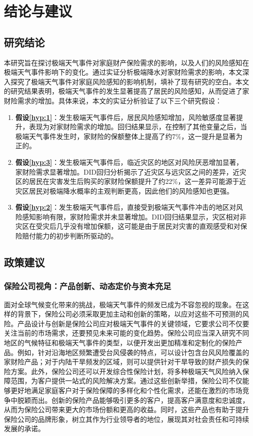 \chapter{结论与建议}\label{chap:5}

\section{研究结论}
本研究旨在探讨极端天气事件对家庭财产保险需求的影响，以及人们的风险感知在极端天气事件影响下的变化。通过实证分析极端降水对家财险需求的影响，本文深入探究了极端天气事件对家庭风险感知的影响机制，填补了现有研究的空白。本文的研究结果表明，极端天气事件的发生显著提高了居民的风险感知，从而促进了家财险需求的增加。具体来说，本文的实证分析验证了以下三个研究假设：

\begin{enumerate}
    \item \textbf{假设\ref{hyp:1}}：发生极端天气事件后，居民风险感知增加，风险敏感度显著提升，表现为对家财险需求的增加。回归结果显示，在控制了其他变量之后，当极端天气事件发生时，家财险的保额整体上提高了约7\%，这一提升是显著为正的。
    \item \textbf{假设\ref{hyp:3}}：发生极端天气事件后，临近灾区的地区对风险厌恶增加显著，家财险需求显著增加。DID回归分析揭示了近灾区与远灾区之间的差异，近灾区的居民在灾害发生后购买的家财险保额提升了约22\%，这一差异可能源于近灾区居民对极端降水概率的主观判断更高，因此他们的风险感知也更强。
    \item \textbf{假设\ref{hyp:2}}：发生极端天气事件后，直接受到极端天气事件冲击的地区对风险感知影响有限，家财险需求并未显著增加。DID回归结果显示，灾区相对非灾区在受灾后几乎没有增加保额，这可能是由于居民对灾害的直观感受和对保险赔付能力的初步判断所驱动的。
\end{enumerate}

\section{政策建议}
\subsection{保险公司视角：产品创新、动态定价与资本充足}
面对全球气候变化带来的挑战，极端天气事件的频发已成为不容忽视的现象。在这样的背景下，保险公司必须采取更加主动和创新的策略，以应对这些不可预测的风险。产品设计与创新是保险公司应对极端天气事件的关键领域，它要求公司不仅要关注当前的市场需求，还要预见未来可能的变化趋势。保险公司应当深入研究不同地区的气候特征和极端天气事件的类型，以便开发出更加精准和定制化的保险产品。例如，针对沿海地区频繁遭受台风侵袭的特点，可以设计包含台风风险覆盖的家财险产品；对于内陆干旱频发的区域，则可以提供针对干旱导致的财产损失的保险方案。此外，保险公司还可以开发综合性保险计划，将多种极端天气风险纳入保障范围，为客户提供一站式的风险解决方案。通过这些创新举措，保险公司不仅能够更好地满足家庭客户对于保险保障的多样化和个性化需求，还能在激烈的市场竞争中脱颖而出。创新的保险产品能够吸引更多的客户，提高客户满意度和忠诚度，从而为保险公司带来更大的市场份额和更高的收益。同时，这些产品也有助于提升保险公司的品牌形象，树立其作为行业领导者的地位，展现其对社会责任和可持续发展的承诺。

